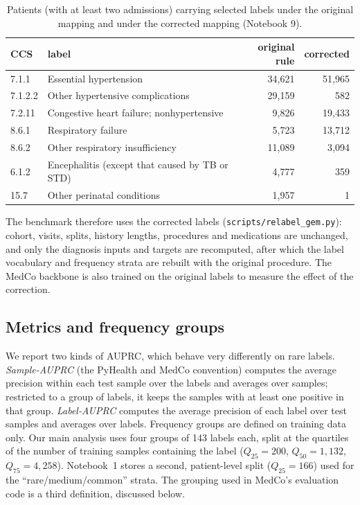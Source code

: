 \documentclass[11pt]{article}
\begin{document}
\begin{table}[H]
\centering\small
\begin{tabular}{llrr}
\toprule
CCS & label & original rule & corrected\\
\midrule
7.1.1 & Essential hypertension & 34,621 & 51,965\\
7.1.2.2 & Other hypertensive complications & 29,159 & 582\\
7.2.11 & Congestive heart failure; nonhypertensive & 9,826 & 19,433\\
8.6.1 & Respiratory failure & 5,723 & 13,712\\
8.6.2 & Other respiratory insufficiency & 11,089 & 3,094\\
6.1.2 & Encephalitis (except that caused by TB or STD) & 4,777 & 359\\
15.7 & Other perinatal conditions & 1,957 & 1\\
\bottomrule
\end{tabular}
\caption{Patients (with at least two admissions) carrying selected labels under the original mapping and under
the corrected mapping (Notebook 9).}
\label{tab:gemfix}
\end{table}


The benchmark therefore uses the corrected labels (\texttt{scripts/relabel\_gem.py}): cohort, visits, splits,
history lengths, procedures and medications are unchanged, and only the diagnosis inputs and targets are
recomputed, after which the label vocabulary and frequency strata are rebuilt with the original procedure. The
MedCo backbone is also trained on the original labels to measure the effect of the correction.

\subsection{Metrics and frequency groups}
We report two kinds of AUPRC, which behave very differently on rare
labels. \emph{Sample-AUPRC} (the PyHealth and MedCo convention) computes the average precision within each test
sample over the labels and averages over samples; restricted to a group of labels, it keeps the samples with at
least one positive in that group. \emph{Label-AUPRC} computes the average precision of each label over test
samples and averages over labels. Frequency groups are defined on training data only. Our main analysis uses
four groups of 143 labels each, split at the quartiles of the number of training samples containing the label
($Q_{25}=200$, $Q_{50}=1{,}132$, $Q_{75}=4{,}258$). Notebook~1 stores a second, patient-level split
($Q_{25}=166$) used for the ``rare/medium/common'' strata. The grouping used in MedCo's evaluation code is a
third definition, discussed below.
\end{document}
